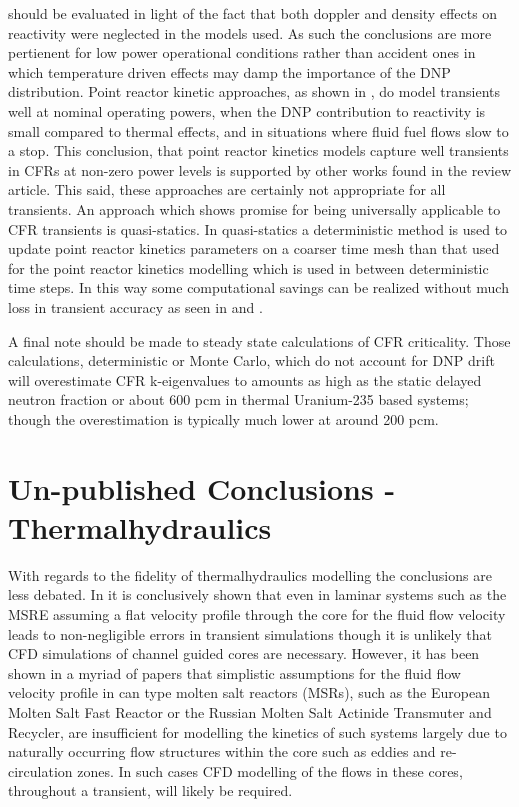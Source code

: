 \documentclass[11pt,letterpaper,twoside,english,final]{article}
\begin{document}
{should be evaluated in light of the fact that both doppler and density effects
on reactivity were neglected in the models used. As such the conclusions are
more pertienent for low power operational conditions rather than accident ones in which
temperature driven effects may damp the importance of the DNP distribution.
 Point reactor kinetic approaches, as
shown in \cite{zhang_comparison_2009}, do model transients well at nominal
operating powers, when the DNP contribution to reactivity is small compared
to thermal effects, and in situations where fluid fuel flows slow to a stop.
This conclusion, that point reactor kinetics models capture well transients in
CFRs at non-zero power levels is supported by other works found in the
review article. This said, these approaches are certainly not appropriate
for all transients. An approach which shows promise for being universally
applicable to CFR transients is quasi-statics. In quasi-statics a deterministic
method is used to update point reactor kinetics parameters on a coarser time
mesh than that used for the point reactor kinetics modelling which is used
in between deterministic time steps. In this way some computational savings
can be realized without much loss in transient accuracy as seen in
\cite{dulla_models_2005} and \cite{rineiski_kinetics_2005}.
\par A final note should be made to steady state calculations of CFR
criticality. Those calculations, deterministic or Monte Carlo, which do not
account for DNP drift will overestimate CFR k-eigenvalues to amounts as high
as the static delayed neutron fraction or about 600 pcm in thermal Uranium-235
based systems; though the overestimation is typically much lower at around 
200 pcm.

\section{Un-published Conclusions - Thermalhydraulics}
With regards to the fidelity of thermalhydraulics modelling the conclusions
are less debated. In \cite{dulla_interactions_2007} it is conclusively shown that
even in laminar systems such as the MSRE assuming a flat velocity profile
through the core for the fluid flow velocity leads to non-negligible errors
in transient simulations though it is unlikely that CFD simulations of channel
guided cores are necessary. However, it has been shown in a myriad of papers
that simplistic assumptions for the fluid flow velocity profile in can type
molten salt reactors (MSRs), such as the European Molten Salt Fast Reactor or
the Russian Molten Salt Actinide Transmuter and Recycler, are insufficient for
modelling the kinetics of such systems largely due to naturally occurring flow
structures within the core such as eddies and re-circulation zones. In such
cases CFD modelling of the flows in these cores, throughout a transient, will
likely be required.

}
\end{document}
